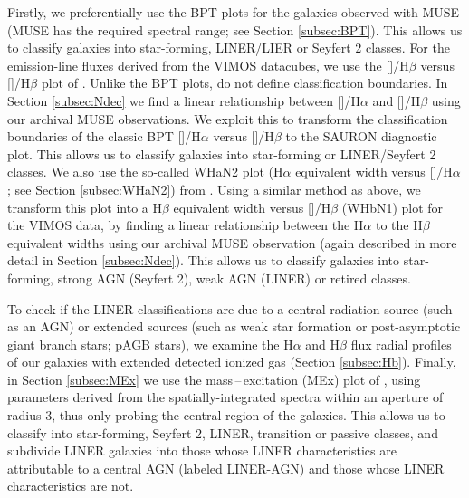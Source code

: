 	Firstly, we preferentially use the BPT plots for the galaxies observed with MUSE (MUSE has the required spectral range; see Section \ref{subsec:BPT}). This allows us to classify galaxies into star-forming, LINER/LIER or Seyfert 2 classes. For the emission-line fluxes derived from the VIMOS datacubes, we use the []/H$\beta$ versus []/H$\beta$ plot of \citet[hereafter the SAURON plot]{Sarzi2010}. Unlike the BPT plots, \citet{Sarzi2010} do not define classification boundaries. In Section \ref{subsec:Ndec} we find a linear relationship between []/H$\alpha$ and []/H$\beta$ using our archival MUSE observations. We exploit this to transform the classification boundaries of the classic BPT []/H$\alpha$ versus []/H$\beta$ to the SAURON diagnostic plot. %
	This allows us to classify galaxies into star-forming or LINER/Seyfert 2 classes. We also use the so-called WHaN2 plot (H$\alpha$ equivalent width versus []/H$\alpha$; see Section \ref{subsec:WHaN2}) from \citet{CidFernandes2011}. Using a similar method as above, we transform this plot into a H$\beta$ equivalent width versus []/H$\beta$ (WHbN1) plot for the VIMOS data, by finding a linear relationship between the H$\alpha$ to the H$\beta$ equivalent widths using our archival MUSE observation (again described in more detail in Section \ref{subsec:Ndec}). %
	This allows us to classify galaxies into star-forming, strong AGN (Seyfert 2), weak AGN (LINER) or retired classes. 

	To check if the LINER classifications are due to a central radiation source (such as an AGN) or extended sources (such as weak star formation or post-asymptotic giant branch stars; pAGB stars), we examine the H$\alpha$ and H$\beta$ flux radial profiles of our galaxies with extended detected ionized gas (Section \ref{subsec:Hb}). Finally, in Section \ref{subsec:MEx} we use the mass\,--\,excitation (MEx) plot of \cite{Nyland2016}, using parameters derived from the spatially-integrated spectra within an aperture of radius 3\arcsec, thus only probing the central region of the galaxies. This allows us to classify into star-forming, Seyfert 2, LINER, transition or passive classes, and subdivide LINER galaxies into those whose LINER characteristics are attributable to a central AGN (labeled LINER-AGN) and those whose LINER characteristics are not. 

